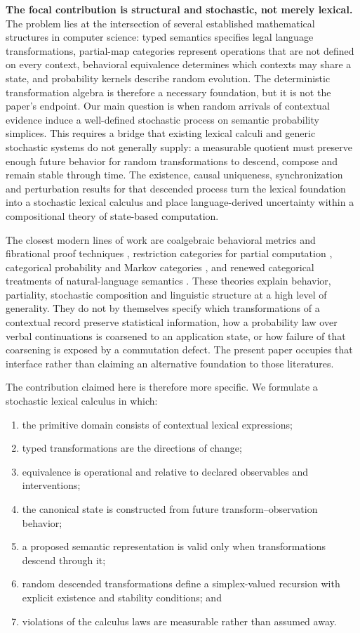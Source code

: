 \documentclass[11pt]{article}
\begin{document}
\textbf{The focal contribution is structural and stochastic, not merely
lexical.}  The problem lies at the intersection of several established
mathematical structures in computer science: typed semantics specifies legal
language transformations, partial-map categories represent operations that
are not defined on every context, behavioral equivalence determines which
contexts may share a state, and probability kernels describe random
evolution.  The deterministic transformation algebra is therefore a
necessary foundation, but it is not the paper's endpoint.  Our main question
is when random arrivals of contextual evidence induce a well-defined
stochastic process on semantic probability simplices.  This requires a bridge
that existing lexical calculi and generic stochastic systems do not generally
supply: a measurable quotient must preserve enough future behavior for random
transformations to descend, compose and remain stable through time.  The
existence, causal uniqueness, synchronization and perturbation results for
that descended process turn the lexical foundation into a stochastic lexical
calculus and place language-derived uncertainty within a compositional theory
of state-based computation.

The closest modern lines of work are coalgebraic
behavioral metrics and fibrational proof techniques
\cite{baldan2018,bonchi2023}, restriction categories for partial computation
\cite{cockettlack2002,cockett2025}, categorical probability and Markov
categories \cite{fritz2022,jacobs2023}, and renewed categorical treatments of
natural-language semantics \cite{chatzikyriakidis2026,cousin2023}.  These
theories explain behavior, partiality, stochastic composition and linguistic
structure at a high level of generality.  They do not by themselves specify
which transformations of a contextual record preserve statistical
information, how a probability law over verbal continuations is coarsened to
an application state, or how failure of that coarsening is exposed by a
commutation defect.  The present paper occupies that interface rather than
claiming an alternative foundation to those literatures.

The contribution claimed here is therefore more specific. We formulate a
stochastic lexical calculus in which:
\begin{enumerate}
\item the primitive domain consists of contextual lexical expressions;
\item typed transformations are the directions of change;
\item equivalence is operational and relative to declared observables and interventions;
\item the canonical state is constructed from future transform--observation behavior;
\item a proposed semantic representation is valid only when transformations descend through it;
\item random descended transformations define a simplex-valued recursion with
explicit existence and stability conditions; and
\item violations of the calculus laws are measurable rather than assumed away.
\end{enumerate}
\end{document}
